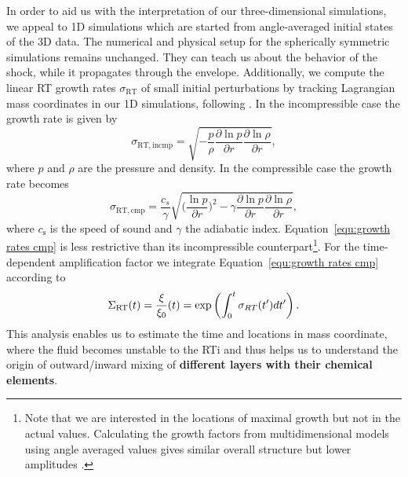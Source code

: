 \documentclass[fleqn,usenatbib]{mnras}
\begin{document}
In order to aid us with the interpretation of our three-dimensional simulations, we appeal to 1D simulations which are started from angle-averaged initial states of the 3D data. The numerical and physical setup for the spherically symmetric simulations remains unchanged. 
They can teach us about the behavior of the shock, while it propagates through the envelope. 
Additionally, we compute the linear RT growth rates $\sigma_{\mathrm{RT}}$ of small initial perturbations by tracking Lagrangian mass coordinates in our 1D simulations, following \cite{Mueller1991}. 
In the incompressible case the growth rate is given by
\begin{equation}
  \label{equ:growth rates incmp}
  \sigma_{\mathrm{RT,incmp}} = \sqrt{- \frac{p}{\rho}\frac{\partial \ln p}{\partial r}\frac{\partial \ln \rho}{\partial r}},
\end{equation}
where $p$ and $\rho$ are the pressure and density. In the compressible case the growth rate becomes
\begin{equation}
  \sigma_{\mathrm{RT, cmp}} = \frac{c_{s}}{\gamma}\sqrt{\Big(\frac{\ln p}{\partial r}\Big)^ 2 - \gamma \frac{\partial \ln p}{\partial r}\frac{\partial \ln \rho}{\partial r}},
  \label{equ:growth rates cmp}
\end{equation}
where $c_{\mathrm{s}}$ is the speed of sound and $\gamma$ the adiabatic index. Equation~\ref{equ:growth rates cmp} is less restrictive than its incompressible counterpart\footnote{Note that we are interested in the locations of maximal growth but not in the actual values. Calculating the growth factors from multidimensional models using angle averaged values gives similar overall structure but lower amplitudes \citep{Mueller2018}.}. 
For the time-dependent amplification factor we integrate Equation~\ref{equ:growth rates cmp} according to
\begin{equation}
  \Sigma_{\rm RT}(t) = \frac{\xi}{\xi_0}(t) = \exp \left(\int_0^t \sigma_{RT} (t') dt' \right).\label{equ:growth rates int}
\end{equation}
This analysis enables us to estimate the time and locations in mass coordinate, where the fluid becomes unstable to the RTi and thus helps us to understand the origin of outward/inward mixing of \textbf{different layers with their chemical elements}.
\end{document}
